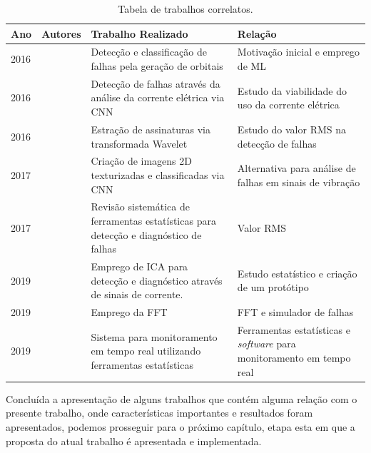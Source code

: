 \begin{table}[H]
    \caption{Tabela de trabalhos correlatos.}
    \label{tab:correlatos}
    \centering%
        \begin{tabular}{|p{}|p{}|p{}|p{}|}
            \hline
            Ano  & Autores                      & Trabalho Realizado                                                                    & Relação                        \\ \hline
            2016 & \cite{Jeong2016}             & Detecção e classificação de falhas pela geração de orbitais                           & Motivação inicial e emprego de ML \\ \hline
            2016 & \cite{Ince2016}              & Detecção de falhas através da análise da corrente elétrica via CNN                    & Estudo da viabilidade do uso da corrente elétrica \\ \hline
            2016 & \cite{Hemmati2016a}          & Estração de assinaturas via transformada Wavelet                                      & Estudo do valor RMS na detecção de falhas \\ \hline
            2017 & \cite{Hatami2017}            & Criação de imagens 2D texturizadas e classificadas via CNN                            & Alternativa para análise de falhas em sinais de vibração \\ \hline
            2017 & \cite{Caesarendra2017}       & Revisão sistemática de ferramentas estatísticas para detecção e diagnóstico de falhas & Valor RMS \\ \hline
            2019 & \cite{Garcia-Bracamonte2019} & Emprego de ICA para detecção e diagnóstico através de sinais de corrente.             & Estudo estatístico e criação de um protótipo \\ \hline
            2019 & \cite{Azeem2019}             & Emprego da FFT                                                                        & FFT e simulador de falhas \\ \hline
            2019 & \cite{Zhang2019}             & Sistema para monitoramento em tempo real utilizando ferramentas estatísticas          & Ferramentas estatísticas e \textit{software} para monitoramento em tempo real \\ \hline        
        \end{tabular}
  \end{table}

Concluída a apresentação de alguns trabalhos que contém alguma relação com o presente trabalho, onde características importantes e resultados 
foram apresentados, podemos prosseguir para o próximo capítulo, etapa esta em que a proposta do atual trabalho é apresentada e implementada.